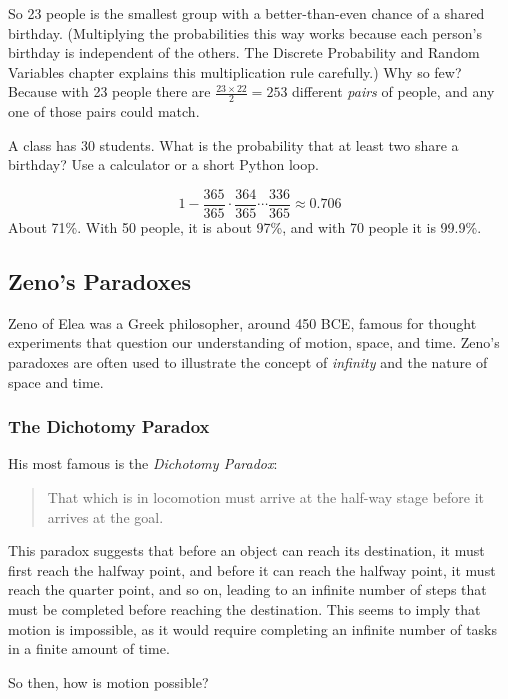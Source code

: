 So 23 people is the smallest group with a better-than-even chance of a
shared birthday. (Multiplying the probabilities this way works because each person's birthday is
independent of the others. The Discrete Probability and Random Variables chapter explains this multiplication rule
carefully.) Why so few? Because with 23 people there are
$\frac{23 \times 22}{2} = 253$ different \emph{pairs} of people, and any
one of those pairs could match.

\begin{Exercise}[title={Your class}, label=par_birthday]
A class has 30 students. What is the probability that at least two share a
birthday? Use a calculator or a short Python loop.
\end{Exercise}
\begin{Answer}[ref=par_birthday]
$$1 - \frac{365}{365} \cdot \frac{364}{365} \cdots \frac{336}{365} \approx 0.706$$
About 71\%. With 50 people, it is about 97\%, and with 70 people it is
99.9\%.
\end{Answer}

\subsection{Zeno's Paradoxes}
Zeno of Elea was a Greek philosopher, around 450
BCE, famous for thought experiments that question our understanding of
motion, space, and time. Zeno's paradoxes are often used to illustrate the concept of \textit{infinity} and the nature of space and time.

\subsubsection{The Dichotomy Paradox}
His most famous is the \textit{Dichotomy
Paradox}:
\begin{quote}
    That which is in locomotion must arrive at the half-way stage before it arrives at the goal.
\end{quote}
This paradox suggests that before an object can reach its destination, it must first reach the halfway point, and before it can reach the halfway point, it must reach the quarter point, and so on, leading to an infinite number of steps that must be completed before reaching the destination. This seems to imply that motion is impossible, as it would require completing an infinite number of tasks in a finite amount of time.

So then, how is motion possible?

